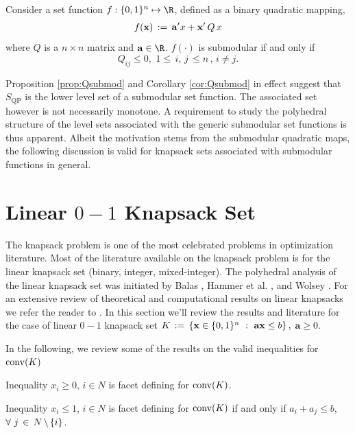 \documentclass[10pt,twoside]{amsart}
\begin{document}
\begin{cor}
  \label{cor:Qsubmod}
  Consider a set function $f: \binset^n\mapsto \R$, defined as a binary quadratic mapping,
  \begin{align}
    f(\mathbf{x}) \,:=\, \mathbf{a}'x + \mathbf{x}'\,Q\,x
  \end{align}
  where $Q$ is a $n\times n$ matrix and $\a \in \R$. $f(\cdot)$ is submodular if and only if $$Q_{ij} \leq 0,\,\, 1\leq \,i,\,j\,\leq n\,,\,i\neq j.$$
\end{cor}

Proposition \ref{prop:Qsubmod} and Corollary \ref{cor:Qsubmod} in effect suggest that $S_{\text{QP}}$ is the lower level set of a submodular set function. The associated set however is not necessarily monotone. A requirement to study the polyhedral structure of the level sets associated with the generic submodular set functions is thus apparent. Albeit the motivation stems from the submodular quadratic maps, the following discussion is valid for knapsack sets associated with submodular functions in general.

\section{Linear $0-1$ Knapsack Set}
The knapsack problem is one of the most celebrated problems in optimization literature. Most of the literature available on the knapsack problem is for the linear knapsack set (binary, integer, mixed-integer). The polyhedral analysis of the linear knapsack set was initiated by Balas \cite{Balas1975,Balas1978}, Hammer et al. \cite{Hammer1975}, and Wolsey \cite{Wolsey1975}. For an extensive review of theoretical and computational results on linear knapsacks we refer the reader to \cite{Atamturk2003,Atamturk2005,Gu1998,Martello1990}. In this section we'll review the results and literature for the case of linear $0-1$ knapsack set $K \,:=\, \left\{ {\mathbf{x} \in \{0,1\}^n} \ : \ {\mathbf{a}\mathbf{x} \leq b} \right\},$ $\mathbf{a} \geq 0$.

In the following, we review some of the results on the valid inequalities for $\operatorname{conv}(K)$
\begin{prop}
  Inequality $x_i \geq 0$, $i\in N$ is facet defining for $\operatorname{conv}(K)$.
\end{prop}

\begin{prop}
  Inequality $x_i \leq 1$, $i\in N$ is facet defining for $\operatorname{conv}(K)$ if and only if $a_i + a_j \leq b$, $\forall\,\,j\,\in\, N\,\backslash\,\{i\}$.
\end{prop}
\end{document}
